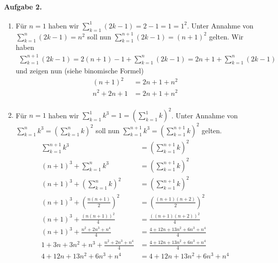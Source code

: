 \documentclass{article}
\begin{document}
\paragraph{Aufgabe 2.} \begin{enumerate}
    \item Für $n = 1$ haben wir $\sum_{k = 1}^{1} (2k - 1) = 2 - 1 = 1 = 1^2$. Unter Annahme von $\sum^n_{k = 1}(2k - 1) = n^2$ soll nun $\sum^{n + 1}_{k = 1}(2k - 1) = (n + 1)^2$ gelten. Wir haben
    \begin{align*}
        \sum^{n + 1}_{k = 1}(2k - 1) = 2(n + 1) - 1 + \sum^{n}_{k = 1}(2k - 1) = 2n + 1 + \sum^{n}_{k = 1}(2k - 1)
    \end{align*}
    und zeigen nun (siehe binomische Formel)
    \begin{align*}
        (n + 1)^2 &= 2n + 1 + n^2 \\
        n^2 + 2n + 1 &= 2n + 1 + n^2 \\
    \end{align*}

    \item Für $n = 1$ haben wir $\sum_{k = 1}^{1}k^3 = 1 = (\sum_{k = 1}^1k)^2$. Unter Annahme von $\sum_{k = 1}^n k^3 = (\sum^n_{k = 1}k)^2$ soll nun $\sum^{n + 1}_{k = 1}k^3 = (\sum^{n + 1}_{k = 1}k)^2$ gelten. 
    \begin{align*}
        \sum^{n + 1}_{k = 1}k^3 &= \left(\sum^{n + 1}_{k = 1}k\right)^2 \\
        (n + 1)^3 + \sum^{n}_{k = 1}k^3 &= \left(\sum^{n + 1}_{k = 1}k\right)^2 \\
        (n + 1)^3 + \left(\sum^n_{k = 1}k\right)^2 &= \left(\sum^{n + 1}_{k = 1}k\right)^2 \\
        (n + 1)^3 + \left(\frac{n(n + 1)}{2}\right)^2 &= \left(\frac{(n + 1)(n + 2)}{2}\right)^2 \\
        (n + 1)^3 + \frac{(n(n + 1))^2}{4} &= \frac{((n + 1)(n + 2))^2}{4} \\
        (n + 1)^3 + \frac{n^2 + 2 n^3 + n^4}{4} &= \frac{4 + 12 n + 13 n^2 + 6 n^3 + n^4}{4} \\
        1 + 3 n + 3 n^2 + n^3 + \frac{n^2 + 2 n^3 + n^4}{4} &= \frac{4 + 12 n + 13 n^2 + 6 n^3 + n^4}{4} \\
        4 + 12 n + 13 n^2 + 6 n^3 + n^4 &= 4 + 12 n + 13 n^2 + 6 n^3 + n^4
    \end{align*}
\end{enumerate}
\end{document}
